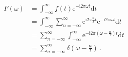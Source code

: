 \begin{align}
    F(\omega) & =\int_{-\infty}^{\infty}f(t)\mathrm{e}^{-\mathrm{i}2\pi\omega t}\mathrm{d}t\nonumber                                                                    \\
              & =\int_{-\infty}^{\infty}\sum\limits_{n=-\infty}^{\infty}\mathrm{e}^{\mathrm{i}2\pi\frac{n}{T}t}\mathrm{e}^{-\mathrm{i}2\pi\omega t}\mathrm{d}t\nonumber \\
              & =\sum\limits_{n=-\infty}^{\infty}\int_{-\infty}^{\infty}\mathrm{e}^{-\mathrm{i}2\pi(\omega-\frac{n}{T})t}\mathrm{d}t\nonumber                           \\
              & =\sum\limits_{n=-\infty}^{\infty}\delta(\omega-\frac{n}{T})\, .
\end{align}